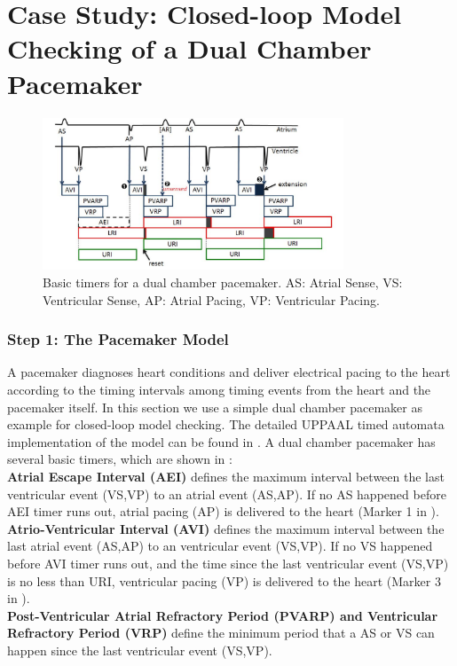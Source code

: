\section{Case Study: Closed-loop Model Checking of a Dual Chamber Pacemaker}
\label{caseStudy}
\begin{figure}[!t]
	\centering
	\includegraphics[width=0.8\textwidth]{figs/PM_timers.pdf}
	\caption{\small Basic timers for a dual chamber pacemaker. AS: Atrial Sense, VS: Ventricular Sense, AP: Atrial Pacing, VP: Ventricular Pacing.}
	\label{fig:PM_timers}
\end{figure}

\subsubsection{Step 1: The Pacemaker Model}
A pacemaker diagnoses heart conditions and deliver electrical pacing to the heart according to the timing intervals among timing events from the heart and the pacemaker itself. In this section we use a simple dual chamber pacemaker as example for closed-loop model checking. The detailed UPPAAL timed automata implementation of the model can be found in \cite{sttt13}. A dual chamber pacemaker has several basic timers, which are shown in :\\
\textbf{Atrial Escape Interval (AEI)} defines the maximum interval between the last ventricular event (VS,VP) to an atrial event (AS,AP). If no AS happened before AEI timer runs out, atrial pacing (AP) is delivered to the heart (Marker 1 in ). \\
\textbf{Atrio-Ventricular Interval (AVI)} defines the maximum interval between the last atrial event (AS,AP) to an ventricular event (VS,VP). If no VS happened before AVI timer runs out, and the time since the last ventricular event (VS,VP) is no less than URI, ventricular pacing (VP) is delivered to the heart (Marker 3 in ).\\
\textbf{Post-Ventricular Atrial Refractory Period (PVARP) and Ventricular Refractory Period (VRP)} define the minimum period that a AS or VS can happen since the last ventricular event (VS,VP). 


